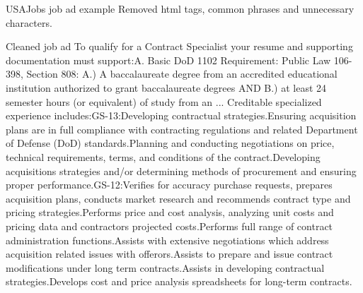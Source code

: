 \documentclass{beamer}
\begin{document}
\begin{frame}{USAJobs job ad example}
  Removed html tags, common phrases and unnecessary characters.
  \scriptsize
  \begin{exampleblock}{Cleaned job ad}
    To qualify for a Contract Specialist your resume and supporting documentation must support:A. Basic DoD 1102 Requirement: Public Law 106-398, Section 808: A.) A baccalaureate degree from an accredited educational institution authorized to grant baccalaureate degrees AND B.) at least 24 semester hours (or equivalent) of study from an ... Creditable specialized experience includes:GS-13:Developing contractual strategies.Ensuring acquisition plans are in full compliance with contracting regulations and related Department of Defense (DoD) standards.Planning and conducting negotiations on price, technical requirements, terms, and conditions of the contract.Developing acquisitions strategies and/or determining methods of procurement and ensuring proper performance.GS-12:Verifies for accuracy purchase requests, prepares acquisition plans, conducts market research and recommends contract type and pricing strategies.Performs price and cost analysis, analyzing unit costs and pricing data and contractors projected costs.Performs full range of contract administration functions.Assists with extensive negotiations which address acquisition related issues with offerors.Assists to prepare and issue contract modifications under long term contracts.Assists in developing contractual strategies.Develops cost and price analysis spreadsheets for long-term contracts.
  \end{exampleblock}
\end{frame}
\end{document}
